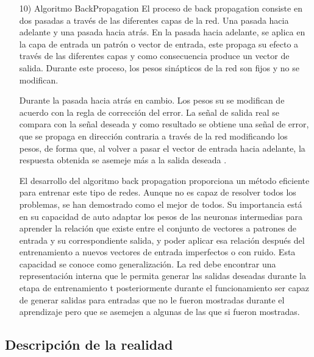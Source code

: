 \documentclass[a4paper, 12pt]{article}
\begin{document}
\begin{enumerate}
\vskip 0.3cm

\item[10)] Algoritmo BackPropagation
\vskip 0.3cm
El proceso de back propagation consiste en dos pasadas a través de las diferentes capas de la red. Una pasada hacia adelante y una pasada hacia atrás. En la pasada hacia adelante, se aplica en la capa de entrada un patrón o vector de entrada, este propaga su efecto a través de las diferentes capas y como consecuencia produce un vector de salida. Durante este proceso, los pesos sinápticos de la red son fijos y no se modifican.\par
Durante la pasada hacia atrás en cambio. Los pesos su se modifican de acuerdo con la regla de corrección del error. La señal de salida real se compara con la señal deseada y como resultado se obtiene una señal de error, que se propaga en dirección contraria a través de la red modificando los pesos, de forma que, al volver a pasar el vector de entrada hacia adelante, la respuesta obtenida se asemeje más a la salida deseada .\citep{emiliano}\par
El desarrollo del algoritmo back propagation proporciona un método eficiente para entrenar este tipo de redes. Aunque no es capaz de resolver todos los problemas, se han demostrado como el mejor de todos. Su importancia está en su capacidad de auto adaptar los pesos de las neuronas intermedias para aprender la relación que existe entre el conjunto de vectores a patrones de entrada y su correspondiente salida, y poder aplicar esa relación después del entrenamiento a nuevos vectores de entrada imperfectos o con ruido. Esta capacidad se conoce como generalización. La red debe encontrar una representación interna que le permita generar las salidas deseadas durante la etapa de entrenamiento t posteriormente durante el funcionamiento ser capaz de generar salidas para entradas que no le fueron mostradas durante el aprendizaje pero que se asemejen a algunas de las que si fueron mostradas.\par

\vskip 0.3cm

\end{enumerate}


\subsection{Descripción de la realidad}
\end{document}
